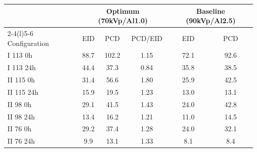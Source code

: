 \begin{tabular}{@{}lccccc@{}}
\toprule
 & \multicolumn{3}{c}{Optimum (70kVp/Al1.0)} & \multicolumn{2}{c}{Baseline (90kVp/Al2.5)} \\
\cmidrule(lr){2-4}\cmidrule(l){5-6}
Configuration & EID & PCD & PCD/EID & EID & PCD \\
\midrule
I 113 0h & 88.7 & 102.2 & 1.15 & 72.1 & 92.6 \\
I 113 24h & 44.4 & 37.3 & 0.84 & 35.8 & 38.5 \\
II 115 0h & 31.4 & 56.6 & 1.80 & 25.9 & 42.5 \\
II 115 24h & 15.9 & 19.5 & 1.23 & 13.0 & 13.1 \\
II 98 0h & 29.1 & 41.5 & 1.43 & 24.0 & 42.8 \\
II 98 24h & 13.4 & 16.2 & 1.21 & 11.0 & 14.5 \\
II 76 0h & 29.2 & 37.4 & 1.28 & 24.0 & 32.1 \\
II 76 24h & 9.9 & 13.1 & 1.33 & 8.1 & 8.4 \\
\bottomrule
\end{tabular}
